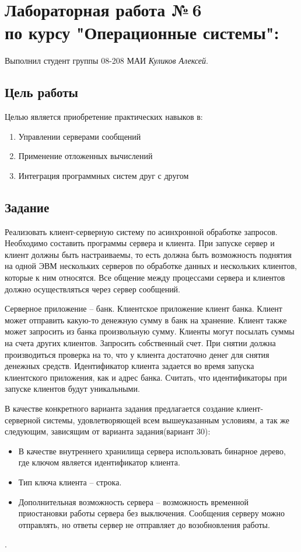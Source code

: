 \documentclass[12pt]{article}
\begin{document}
\section*{Лабораторная работа №\,6 \\ по курсу "Операционные системы": }

Выполнил студент группы 08-208 МАИ \textit{Куликов Алексей}.

\subsection*{Цель работы}
Целью является приобретение практических навыков в:
\begin{enumerate}
    \item Управлении серверами сообщений
    \item Применение отложенных вычислений
    \item Интеграция программных систем друг с другом
\end{enumerate}

\subsection*{Задание}
Реализовать клиент-серверную систему по асинхронной обработке запросов. Необходимо составить программы сервера и клиента. При запуске сервер и клиент должны быть настраиваемы, то есть должна быть возможность поднятия на одной ЭВМ нескольких серверов по обработке данных и нескольких клиентов, которые к ним относятся. Все общение между процессами сервера и клиентов должно осуществляться через сервер сообщений.

Серверное приложение – банк. Клиентское приложение клиент банка. Клиент может отправить какую-то денежную сумму в банк на хранение. Клиент также может запросить из банка произвольную сумму. Клиенты могут посылать суммы на счета других клиентов. Запросить собственный счет. При снятии должна производиться проверка на то, что у клиента достаточно денег для снятия денежных средств. Идентификатор клиента задается во время запуска клиентского приложения, как и адрес банка. Считать, что идентификаторы при запуске клиентов будут уникальными.

В качестве конкретного варианта задания предлагается создание клиент-серверной системы, удовлетворяющей всем вышеуказанным условиям, а так же следующим, зависящим от варианта задания(вариант 30):
\begin{itemize}
    \item В качестве внутреннего хранилища сервера использовать бинарное дерево, где ключом является идентификатор клиента.
    \item Тип ключа клиента -- строка.
    \item Дополнительная возможность сервера -- возможность временной приостановки работы сервера без выключения. Сообщения серверу можно отправлять, но ответы сервер не отправляет до возобновления работы.
\end{itemize}.
\end{document}
